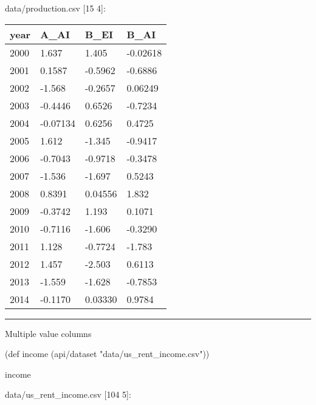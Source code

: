 \documentclass[]{article}
\newenvironment{Shaded}{\begin{snugshade}}{\end{snugshade}}
\newcommand{\StringTok}[1]{\textcolor[rgb]{0.31,0.60,0.02}{#1}}
\newcommand{\FunctionTok}[1]{\textcolor[rgb]{0.00,0.00,0.00}{#1}}
\newcommand{\BuiltInTok}[1]{#1}
\newcommand{\NormalTok}[1]{#1}
\begin{document}
data/production.csv {[}15 4{]}:

\begin{longtable}[]{@{}llll@{}}
\toprule
year & A\_AI & B\_EI & B\_AI\tabularnewline
\midrule
\endhead
2000 & 1.637 & 1.405 & -0.02618\tabularnewline
2001 & 0.1587 & -0.5962 & -0.6886\tabularnewline
2002 & -1.568 & -0.2657 & 0.06249\tabularnewline
2003 & -0.4446 & 0.6526 & -0.7234\tabularnewline
2004 & -0.07134 & 0.6256 & 0.4725\tabularnewline
2005 & 1.612 & -1.345 & -0.9417\tabularnewline
2006 & -0.7043 & -0.9718 & -0.3478\tabularnewline
2007 & -1.536 & -1.697 & 0.5243\tabularnewline
2008 & 0.8391 & 0.04556 & 1.832\tabularnewline
2009 & -0.3742 & 1.193 & 0.1071\tabularnewline
2010 & -0.7116 & -1.606 & -0.3290\tabularnewline
2011 & 1.128 & -0.7724 & -1.783\tabularnewline
2012 & 1.457 & -2.503 & 0.6113\tabularnewline
2013 & -1.559 & -1.628 & -0.7853\tabularnewline
2014 & -0.1170 & 0.03330 & 0.9784\tabularnewline
\bottomrule
\end{longtable}

\begin{center}\rule{0.5\linewidth}{0.5pt}\end{center}

Multiple value columns

\begin{Shaded}
\begin{Highlighting}[]
\NormalTok{(}\BuiltInTok{def}\FunctionTok{ income }\NormalTok{(api/dataset }\StringTok{"data/us_rent_income.csv"}\NormalTok{))}
\end{Highlighting}
\end{Shaded}

\begin{Shaded}
\begin{Highlighting}[]
\NormalTok{income}
\end{Highlighting}
\end{Shaded}

data/us\_rent\_income.csv {[}104 5{]}:
\end{document}
